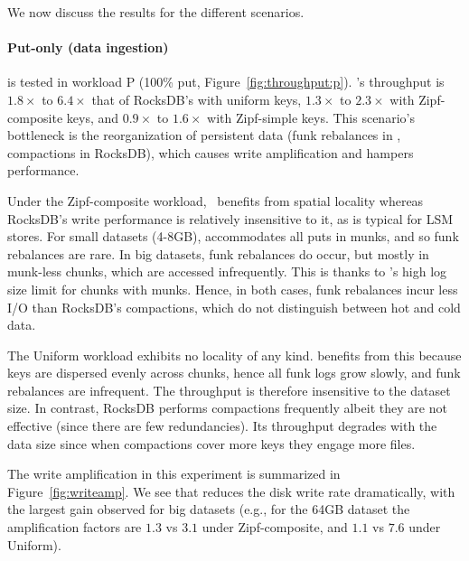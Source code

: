 We now discuss the results for the different scenarios.
  
\paragraph{ Put-only (data ingestion)} is tested in workload
{P} (100\% put, Figure~\ref{fig:throughput:p}). 
\sys's throughput is $1.8\times$ to $6.4\times$ that of RocksDB's with uniform keys, $1.3\times$ to $2.3\times$ with Zipf-composite keys, 
and $0.9\times$ to $1.6\times$ with Zipf-simple keys. This scenario's bottleneck is the reorganization of persistent data  
(funk rebalances in \sys, compactions in RocksDB), which causes write amplification and hampers performance. 
 
 Under the Zipf-composite workload, \sys\ benefits from spatial locality whereas RocksDB's write performance 
 is relatively insensitive to it, as is typical for LSM stores. For small datasets (4-8GB), \sys\/ accommodates 
all puts in munks, and so funk rebalances are rare. In big datasets, funk rebalances do occur, but mostly in 
munk-less chunks, which are accessed infrequently. This is thanks to \sys\/'s high log size limit for chunks 
with munks. Hence, in both cases, funk rebalances incur less I/O than RocksDB's compactions, 
which do not distinguish between hot and cold data. 

 
The Uniform workload exhibits no locality of any kind. 
 \sys\/ benefits from this because keys are dispersed evenly across chunks, hence all funk logs grow 
 slowly, and funk rebalances are infrequent. The throughput is therefore insensitive to the dataset 
 size. In contrast, RocksDB performs compactions frequently albeit they are not effective (since there are few redundancies). Its throughput 
 degrades  with the data size since when compactions cover more keys they engage more files.
 
   
The write amplification in this experiment is summarized in 
Figure~\ref{fig:writeamp}. We see that \sys\/ reduces the disk write rate dramatically, 
with the largest gain observed for big datasets (e.g.,  for the 64GB dataset 
the amplification factors are $1.3$ vs $3.1$ under Zipf-composite, and $1.1$ vs $7.6$ under Uniform). 


